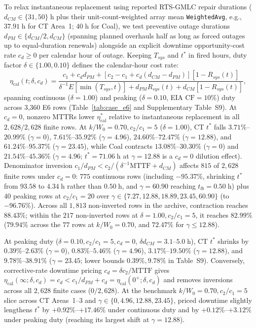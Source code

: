 \documentclass{elektr}
\begin{document}
To relax instantaneous replacement using reported RTS-GMLC repair durations ($d_{CM} \in \{31, 50\}\;\text{h}$ plus their unit-count-weighted array mean \texttt{WeightedAvg}, e.g., $37.91\;\text{h}$ for CT Area~1; $40\;\text{h}$ for Coal), we test preventive outage durations $d_{PM} \in \{d_{CM}/2, d_{CM}\}$ (spanning planned overhauls half as long as forced outages up to equal-duration renewals) alongside an explicit downtime opportunity-cost rate $c_d \ge 0$ per calendar hour of outage. Keeping $T_{sys}$ and $t^*$ in fired hours, duty factor $\delta \in \{1.00, 0.10\}$ defines the calendar-hour cost rate:
\begin{equation}
\eta_{\mathrm{cal}}(t; \delta, c_d) = \frac{c_1 + c_d d_{PM} + [c_2 - c_1 + c_d(d_{CM} - d_{PM})][1 - R_{sys}(t)]}{\delta^{-1}E[\min(T_{sys}, t)] + d_{PM} R_{sys}(t) + d_{CM}[1 - R_{sys}(t)]},
\label{eq:eta_cal_duty}
\end{equation}
spanning continuous ($\delta = 1.00$) and peaking ($\delta = 0.10$, EIA $\mathrm{CF} = 10\%$) duty across 3,360 E6 rows (Table~\ref{tab:case_e6} and Supplementary Table~S9). At $c_d = 0$, nonzero MTTRs lower $\eta_{\mathrm{cal}}^*$ relative to instantaneous replacement in all $2{,}628/2{,}628$ finite rows. At $k/W_0 = 0.70, c_2/c_1 = 5$ ($\delta = 1.00$), CT $t^*$ falls $3.71\%$--$20.99\%$ ($\gamma = 0$), $7.61\%$--$35.92\%$ ($\gamma = 4.96$), $24.60\%$--$72.47\%$ ($\gamma = 12.88$), and $61.24\%$--$95.37\%$ ($\gamma = 23.45$), while Coal contracts $13.08\%$--$30.30\%$ ($\gamma = 0$) and $21.54\%$--$45.36\%$ ($\gamma = 4.96$; $t^* = 71.06\;\text{h}$ at $\gamma = 12.88$ is a $c_d = 0$ dilution effect). Denominator inversion $c_1/d_{PM} < c_2/(\delta^{-1}\mathrm{MTTF} + d_{CM})$ affects $815$ of $2{,}628$ finite rows under $c_d = 0$: $775$ continuous rows (including $-95.37\%$, shrinking $t^*$ from $93.58$ to $4.34\;\text{h}$ rather than $0.50\;\text{h}$, and $\gamma = 60.90$ reaching $t_{lb} = 0.50\;\text{h}$) plus $40$ peaking rows at $c_2/c_1 = 20$ over $\gamma \in \{7.27, 12.88, 18.89, 23.45, 60.90\}$ (to $-96.76\%$). Across all $1{,}813$ non-inverted rows in the archive, contraction reaches $88.43\%$; within the $217$ non-inverted rows at $\delta = 1.00, c_2/c_1 = 5$, it reaches $82.99\%$ ($79.94\%$ across the $77$ rows at $k/W_0 = 0.70$, and $72.47\%$ for $\gamma \le 12.88$).

At peaking duty ($\delta = 0.10, c_2/c_1 = 5, c_d = 0$, $\delta d_{CM} = 3.1$--$5.0\;\text{h}$), CT $t^*$ shrinks by $0.39\%$--$2.63\%$ ($\gamma = 0$), $0.83\%$--$5.46\%$ ($\gamma = 4.96$), $3.17\%$--$19.50\%$ ($\gamma = 12.88$), and $9.78\%$--$38.91\%$ ($\gamma = 23.45$; lower bounds $0.39\%, 9.78\%$ in Table~S9). Conversely, corrective-rate downtime pricing $c_d = \delta c_2 / \mathrm{MTTF}$ gives $\eta_{\mathrm{cal}}(\infty; \delta, c_d) = c_d < c_1/d_{PM} + c_d = \eta_{\mathrm{cal}}(0^+; \delta, c_d)$ and removes inversions across all $2{,}628$ finite cases ($0/2{,}628$). At the benchmark $k/W_0 = 0.70, c_2/c_1 = 5$ slice across CT Areas~1--3 and $\gamma \in \{0, 4.96, 12.88, 23.45\}$, priced downtime slightly lengthens $t^*$ by $+0.92\%$--$+17.46\%$ under continuous duty and by $+0.12\%$--$+3.12\%$ under peaking duty (reaching its largest shift at $\gamma = 12.88$).
\end{document}
